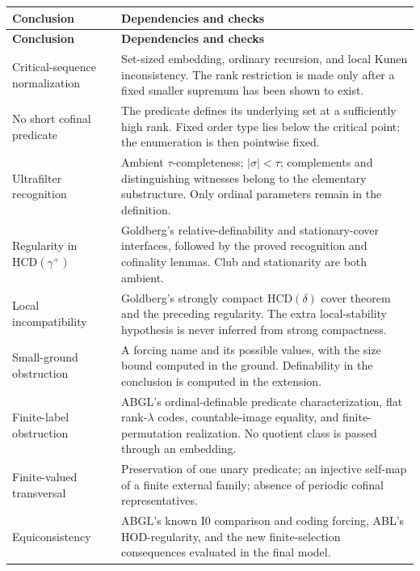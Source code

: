 \documentclass[11pt,letterpaper]{article}
\theoremstyle{definition}
\newcommand{\Izero}{\mathrm{I0}}
\newcommand{\HCD}{\mathrm{HCD}}
\begin{document}
\small
\renewcommand{\arraystretch}{1.16}
\begin{longtable}{@{}P{.26\textwidth}P{.67\textwidth}@{}}
\toprule
\textbf{Conclusion}&\textbf{Dependencies and checks}\\\midrule\endfirsthead
\toprule\textbf{Conclusion}&\textbf{Dependencies and checks}\\\midrule\endhead
Critical-sequence normalization & Set-sized embedding, ordinary recursion, and local Kunen inconsistency. The rank restriction is made only after a fixed smaller supremum has been shown to exist.\\[5pt]
No short cofinal predicate & The predicate defines its underlying set at a sufficiently high rank. Fixed order type lies below the critical point; the enumeration is then pointwise fixed.\\[5pt]
Ultrafilter recognition & Ambient $\tau$-completeness; $|\sigma|<\tau$; complements and distinguishing witnesses belong to the elementary substructure. Only ordinal parameters remain in the definition.\\[5pt]
Regularity in $\HCD(\gamma^+)$ & Goldberg's relative-definability and stationary-cover interfaces, followed by the proved recognition and cofinality lemmas. Club and stationarity are both ambient.\\[5pt]
Local incompatibility & Goldberg's strongly compact $\HCD(\delta)$ cover theorem and the preceding regularity. The extra local-stability hypothesis is never inferred from strong compactness.\\[5pt]
Small-ground obstruction & A forcing name and its possible values, with the size bound computed in the ground. Definability in the conclusion is computed in the extension.\\[5pt]
Finite-label obstruction & ABGL's ordinal-definable predicate characterization, flat rank-$\lambda$ codes, countable-image equality, and finite-permutation realization. No quotient class is passed through an embedding.\\[5pt]
Finite-valued transversal & Preservation of one unary predicate; an injective self-map of a finite external family; absence of periodic cofinal representatives.\\[5pt]
Equiconsistency & ABGL's known $\Izero$ comparison and coding forcing, ABL's HOD-regularity, and the new finite-selection consequences evaluated in the final model.\\
\bottomrule
\end{longtable}
\normalsize
\end{document}
